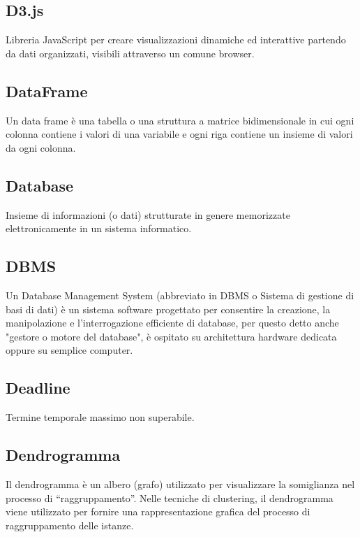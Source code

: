 \documentclass[../glossario.tex]{subfiles}
\begin{document}
\subsection*{D3.js}
{}
Libreria JavaScript per creare visualizzazioni dinamiche ed interattive partendo da dati organizzati, visibili attraverso un comune browser.


\subsection*{DataFrame}
{}
Un data frame è una tabella o una struttura a matrice bidimensionale in cui ogni colonna contiene i valori di una variabile e ogni riga contiene un insieme di valori da ogni colonna.


\subsection*{Database}
{}
Insieme di informazioni (o dati) strutturate in genere memorizzate elettronicamente in un sistema informatico.

\subsection*{DBMS}
{}
Un Database Management System (abbreviato in DBMS o Sistema di gestione di basi di dati) è un sistema software progettato per consentire la creazione, la manipolazione e l'interrogazione efficiente di database, per questo detto anche "gestore o motore del database", è ospitato su architettura hardware dedicata oppure su semplice computer. 

\subsection*{Deadline}
{}
Termine temporale massimo non superabile.

\subsection*{Dendrogramma}
{}
Il dendrogramma è un albero (grafo) utilizzato per visualizzare la somiglianza nel processo di “raggruppamento”. Nelle tecniche di clustering, il dendrogramma viene utilizzato per fornire una rappresentazione grafica del processo di raggruppamento delle istanze.
\end{document}
